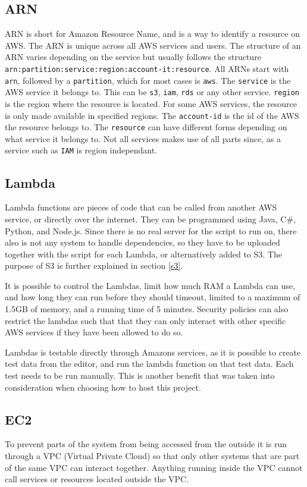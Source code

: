 \subsection{ARN}
ARN is short for Amazon Resource Name, and is a way to identify a resource on AWS. The ARN is unique across all AWS services and users. The structure of an ARN varies depending on the service but usually follows the structure \texttt{arn:partition:service:region:account-it:resource}. All ARNs start with \texttt{arn}, followed by a \texttt{partition}, which for most cases is \texttt{aws}. The \texttt{service} is the AWS service it belongs to. This can be \texttt{s3}, \texttt{iam}, \texttt{rds} or any other service. \texttt{region} is the region where the resource is located. For some AWS services, the resource is only made available in specified regions. The \texttt{account-id} is the id of the AWS the resource belongs to. The \texttt{resource} can have different forms depending on what service it belongs to. Not all services makes use of all parts since, as a service such as \texttt{IAM} is region independant. 

\subsection{Lambda}
Lambda functions are pieces of code that can be called from another AWS service, or directly over the internet. They can be programmed using Java, C\#, Python, and Node.js. Since there is no real server for the script to run on, there also is not any system to handle dependencies, so they have to be uploaded together with the script for each Lambda, or alternatively added to S3. The purpose of S3 is further explained in section \ref{s3}.

It is possible to control the Lambdas, limit how much RAM a Lambda can use, and how long they can run before they should timeout, limited to a maximum of 1.5GB of memory, and a running time of 5 minutes. Security policies can also restrict the lambdas such that that they can only interact with other specific AWS services if they have been allowed to do so.

Lambdas is testable directly through Amazons services, as it is possible to create test data from the editor, and run the lambda function on that test data. Each test needs to be run manually. This is another benefit that was taken into consideration when choosing how to host this project.

\subsection{EC2}
To prevent parts of the system from being accessed from the outside it is run through a VPC (Virtual Private Cloud) so that only other systems that are part of the same VPC can interact together. Anything running inside the VPC cannot call services or resources located outside the VPC.

